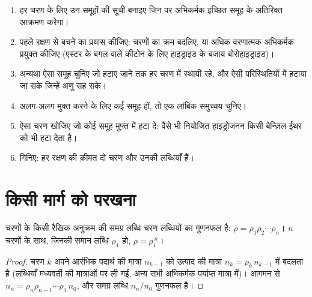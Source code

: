 \begin{method}[किसी मार्ग में रक्षण]\label{met:b2:retrosynthesis:protect-in-route}
\begin{enumerate}
  \item हर चरण के लिए उन समूहों की सूची बनाइए जिन पर अभिकर्मक इच्छित समूह के अतिरिक्त आक्रमण करेगा।
  \item पहले रक्षण से बचने का प्रयास कीजिए: चरणों का क्रम बदलिए, या अधिक वरणात्मक अभिकर्मक प्रयुक्त कीजिए
        (एस्टर के बगल वाले कीटोन के लिए हाइड्राइड के बजाय बोरोहाइड्राइड)।
  \item अन्यथा ऐसा समूह चुनिए जो हटाए जाने तक हर चरण में स्थायी रहे, और ऐसी परिस्थितियों में हटाया जा सके जिन्हें
        अणु सह सके।
  \item अलग-अलग मुक्त करने के लिए कई समूह हों, तो एक लांबिक समुच्चय चुनिए।
  \item ऐसा चरण खोजिए जो कोई समूह मुफ़्त में हटा दे: वैसे भी नियोजित हाइड्रोजनन किसी
        बेन्ज़िल ईथर को भी हटा देता है।
  \item गिनिए: हर रक्षण की क़ीमत दो चरण और उनकी लब्धियाँ हैं।
\end{enumerate}
\end{method}

\section{किसी मार्ग को परखना}\label{sec:b2:retrosynthesis:judging}

\begin{proposition}[समग्र लब्धि]\label{prop:b2:retrosynthesis:overall-yield}
चरणों के किसी रैखिक अनुक्रम की समग्र लब्धि चरण लब्धियों का गुणनफल है:
$\rho = \rho_1 \rho_2 \cdots \rho_n$। $n$ चरणों के साथ, जिनकी समान लब्धि $\rho_1$ हो, $\rho = \rho_1^{\,n}$।
\end{proposition}

\begin{proof}
चरण $k$ अपने आरंभिक पदार्थ की मात्रा $n_{k-1}$ को उत्पाद की मात्रा $n_k = \rho_k\, n_{k-1}$ में बदलता है
(लब्धियाँ मध्यवर्ती की मात्राओं पर ली गईं, अन्य सभी अभिकर्मक पर्याप्त मात्रा में)। आगमन से
$n_n = \rho_n \rho_{n-1} \cdots \rho_1\, n_0$, और समग्र लब्धि $n_n/n_0$ गुणनफल है।
\end{proof}


